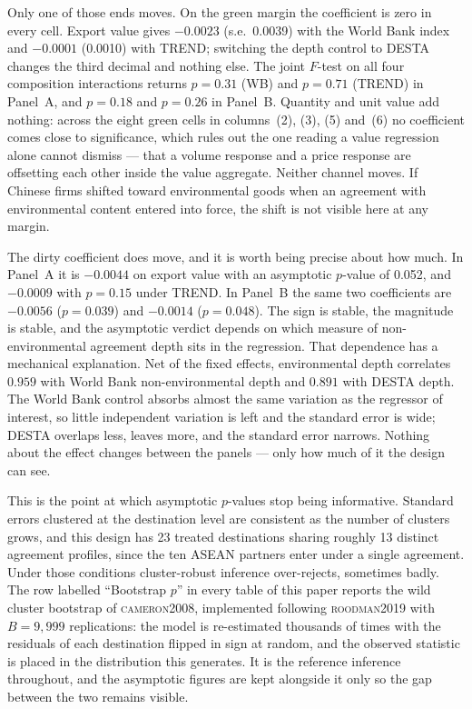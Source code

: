 \documentclass[11pt]{article}
\newcommand{\citet}[1]{\textsc{#1}}
\begin{document}
Only one of those ends moves. On the green margin the coefficient is zero in every cell. Export value
gives $-0.0023$ (s.e.\ 0.0039) with the World Bank index and $-0.0001$ (0.0010) with TREND; switching
the depth control to DESTA changes the third decimal and nothing else. The joint $F$-test on all four
composition interactions returns $p = 0.31$ (WB) and $p = 0.71$ (TREND) in Panel~A, and $p = 0.18$ and
$p = 0.26$ in Panel~B. Quantity and unit value add nothing: across the eight green cells in
columns~(2), (3), (5) and~(6) no coefficient comes close to significance, which rules out the one
reading a value regression alone cannot dismiss --- that a volume response and a price response are
offsetting each other inside the value aggregate. Neither channel moves. If Chinese firms shifted
toward environmental goods when an agreement with environmental content entered into force, the shift
is not visible here at any margin.

The dirty coefficient does move, and it is worth being precise about how much. In Panel~A it is
$-0.0044$ on export value with an asymptotic $p$-value of 0.052, and $-0.0009$ with $p = 0.15$ under
TREND. In Panel~B the same two coefficients are $-0.0056$ ($p = 0.039$) and $-0.0014$ ($p = 0.048$).
The sign is stable, the magnitude is stable, and the asymptotic verdict depends on which measure of
non-environmental agreement depth sits in the regression. That dependence has a mechanical
explanation. Net of the fixed effects, environmental depth correlates $0.959$ with World Bank
non-environmental depth and $0.891$ with DESTA depth. The World Bank control absorbs almost the same
variation as the regressor of interest, so little independent variation is left and the standard error
is wide; DESTA overlaps less, leaves more, and the standard error narrows. Nothing about the effect
changes between the panels --- only how much of it the design can see.

This is the point at which asymptotic $p$-values stop being informative. Standard errors clustered at
the destination level are consistent as the number of clusters grows, and this design has 23 treated
destinations sharing roughly 13 distinct agreement profiles, since the ten ASEAN partners enter under a
single agreement. Under those conditions cluster-robust inference over-rejects, sometimes badly. The
row labelled ``Bootstrap $p$'' in every table of this paper reports the wild cluster bootstrap of
\citet{cameron2008}, implemented following \citet{roodman2019} with $B = 9{,}999$ replications: the
model is re-estimated thousands of times with the residuals of each destination flipped in sign at
random, and the observed statistic is placed in the distribution this generates. It is the reference
inference throughout, and the asymptotic figures are kept alongside it only so the gap between the two
remains visible.
\end{document}
